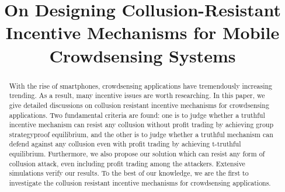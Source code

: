 \documentclass[conference]{IEEEtran}
\theoremstyle{definition}
\begin{document}
\title{On Designing Collusion-Resistant Incentive Mechanisms for Mobile Crowdsensing Systems}
\author{
}
\maketitle

{\color{black}
\begin{abstract}

With the rise of smartphones, crowdsensing applications have tremendously increasing trending. As a result, many incentive issues are worth researching. In this paper, we give detailed discussions on collusion resistant incentive mechanisms for crowdsensing applications. Two fundamental criteria are found: one is to judge whether a truthful incentive mechanism can resist any collusion without profit trading by achieving group strategyproof equilibrium, and the other is to judge whether a truthful mechanism can defend against any collusion even with 
profit trading by achieving t-truthful equilibrium. Furthermore, we also propose our solution which can resist any form of collusion attack, even including profit trading among the attackers. Extensive simulations verify our results. To the best of our knowledge, we are the first to investigate the collusion resistant incentive mechanisms for crowdsensing applications.
\end{abstract}
}
\end{document}
